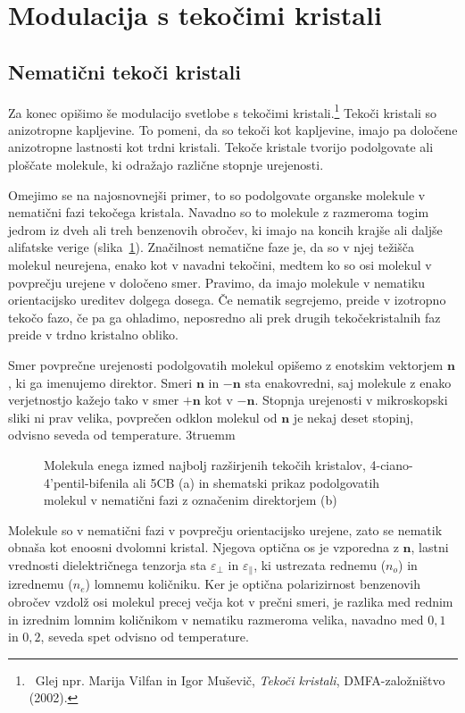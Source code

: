 \section{Modulacija s tekočimi kristali}

\subsection*{Nematični tekoči kristali}
Za konec opišimo še modulacijo svetlobe s tekočimi kristali.\footnote{~Glej npr.
Marija Vilfan in Igor Muševič, {\it Tekoči kristali}, DMFA-založništvo (2002).} 
Tekoči kristali so anizotropne kapljevine. To pomeni, da so tekoči kot 
kapljevine, imajo pa določene anizotropne lastnosti kot trdni kristali. 
Tekoče kristale tvorijo podolgovate ali ploščate molekule, 
ki odražajo različne stopnje urejenosti. 

Omejimo se na najosnovnejši
primer, to so podolgovate organske molekule v nematični fazi tekočega kristala. 
Navadno so to molekule z razmeroma togim jedrom iz
dveh ali treh benzenovih obročev, ki imajo na koncih krajše ali daljše
alifatske verige (slika~\ref{fig:5CB}). Značilnost nematične faze je, da
so v njej težišča molekul neurejena, enako kot v navadni tekočini, medtem ko so 
osi molekul v povprečju urejene v določeno smer. Pravimo, da imajo molekule
v nematiku orientacijsko ureditev dolgega dosega. Če nematik segrejemo,
preide v izotropno tekočo fazo, če pa ga ohladimo, neposredno ali prek drugih
tekočekristalnih faz preide v trdno kristalno obliko. 

Smer povprečne urejenosti podolgovatih molekul opišemo z enotskim vektorjem 
$\mathbf{n}$, ki ga imenujemo direktor. 
Smeri $\mathbf{n}$ in $-\mathbf{n}$ sta 
enakovredni, saj molekule z enako verjetnostjo kažejo tako v smer $+\mathbf{n}$ kot 
v $-\mathbf{n}$. Stopnja urejenosti v mikroskopski sliki ni prav velika, povprečen
odklon molekul od $\mathbf{n}$ je nekaj deset stopinj, odvisno seveda od temperature.
\vglue3truemm
\begin{figure}[ht]
\centering
\def\svgwidth{110truemm}

\caption{Molekula enega izmed najbolj razširjenih tekočih kristalov, 4-ciano-4'pentil-bifenila 
ali 5CB (a) in shematski prikaz podolgovatih molekul v nematični fazi z označenim direktorjem (b)}
\label{fig:5CB}
\end{figure}

Molekule so v nematični fazi v povprečju orientacijsko urejene, zato se nematik
obnaša kot enoosni dvolomni kristal. Njegova optična os je vzporedna 
z $\mathbf{n}$, lastni vrednosti dielektričnega tenzorja sta $\varepsilon_\bot$ in
$\varepsilon_{\parallel}$, ki ustrezata rednemu ($n_o$) in izrednemu ($n_e$) 
lomnemu količniku.
Ker je optična polarizirnost benzenovih obročev vzdolž osi molekul precej večja kot
v prečni smeri, je razlika med rednim in izrednim lomnim količnikom v nematiku razmeroma 
velika, navadno med $0,1$ in $0,2$, seveda spet odvisno od temperature.

